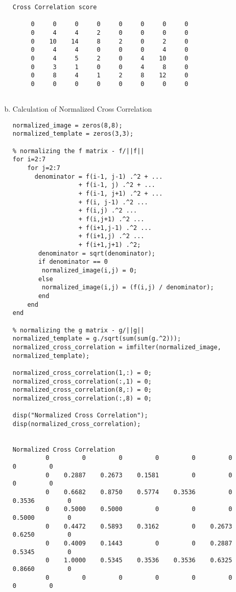 \documentclass{article}
\begin{document}
\begin{enumerate}[(a)]
\begin{verbatim}
Cross Correlation score

     0     0     0     0     0     0     0     0
     0     4     4     2     0     0     0     0
     0    10    14     8     2     0     2     0
     0     4     4     0     0     0     4     0
     0     4     5     2     0     4    10     0
     0     3     1     0     0     4     8     0
     0     8     4     1     2     8    12     0
     0     0     0     0     0     0     0     0
     
  \end{verbatim}

\item Calculation of Normalized Cross Correlation

 \begin{verbatim}
normalized_image = zeros(8,8);
normalized_template = zeros(3,3);

% normalizing the f matrix - f/||f||
for i=2:7
    for j=2:7
      denominator = f(i-1, j-1) .^2 + ...
                  + f(i-1, j) .^2 + ...
                  + f(i-1, j+1) .^2 + ...
                  + f(i, j-1) .^2 ...
                  + f(i,j) .^2 ...
                  + f(i,j+1) .^2 ...
                  + f(i+1,j-1) .^2 ...
                  + f(i+1,j) .^2 ...
                  + f(i+1,j+1) .^2;
       denominator = sqrt(denominator);
       if denominator == 0
        normalized_image(i,j) = 0;
       else
        normalized_image(i,j) = (f(i,j) / denominator);
       end
    end
end

% normalizing the g matrix - g/||g||
normalized_template = g./sqrt(sum(sum(g.^2)));
normalized_cross_correlation = imfilter(normalized_image, normalized_template);

normalized_cross_correlation(1,:) = 0;
normalized_cross_correlation(:,1) = 0;
normalized_cross_correlation(8,:) = 0;
normalized_cross_correlation(:,8) = 0;

disp("Normalized Cross Correlation");
disp(normalized_cross_correlation);


Normalized Cross Correlation
         0         0         0         0         0         0         0         0
         0    0.2887    0.2673    0.1581         0         0         0         0
         0    0.6682    0.8750    0.5774    0.3536         0    0.3536         0
         0    0.5000    0.5000         0         0         0    0.5000         0
         0    0.4472    0.5893    0.3162         0    0.2673    0.6250         0
         0    0.4009    0.1443         0         0    0.2887    0.5345         0
         0    1.0000    0.5345    0.3536    0.3536    0.6325    0.8660         0
         0         0         0         0         0         0         0         0

 \end{verbatim}

\end{enumerate}    
\end{document}
